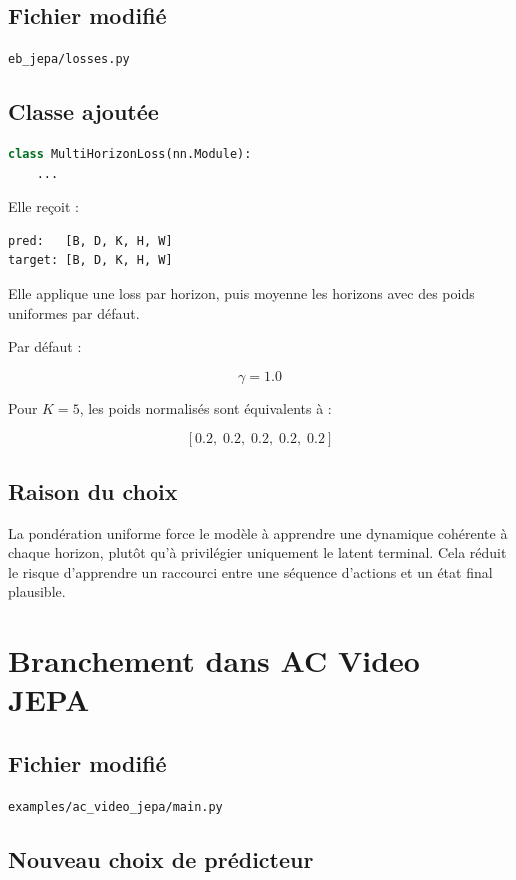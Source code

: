 \documentclass[11pt,a4paper]{article}
\newcommand{\filepath}[1]{\texttt{#1}}
\begin{document}
\subsection{Fichier modifié}

\filepath{eb\_jepa/losses.py}

\subsection{Classe ajoutée}

\begin{lstlisting}[language=Python]
class MultiHorizonLoss(nn.Module):
    ...
\end{lstlisting}

Elle reçoit :

\begin{lstlisting}[language=Python]
pred:   [B, D, K, H, W]
target: [B, D, K, H, W]
\end{lstlisting}

Elle applique une loss par horizon, puis moyenne les horizons avec des poids uniformes
par défaut.

Par défaut :

\[
\gamma = 1.0
\]

Pour \(K=5\), les poids normalisés sont équivalents à :

\[
[0.2,\;0.2,\;0.2,\;0.2,\;0.2]
\]

\subsection{Raison du choix}

La pondération uniforme force le modèle à apprendre une dynamique cohérente à chaque
horizon, plutôt qu'à privilégier uniquement le latent terminal. Cela réduit le risque
d'apprendre un raccourci entre une séquence d'actions et un état final plausible.

\section{Branchement dans AC Video JEPA}

\subsection{Fichier modifié}

\filepath{examples/ac\_video\_jepa/main.py}

\subsection{Nouveau choix de prédicteur}
\end{document}
